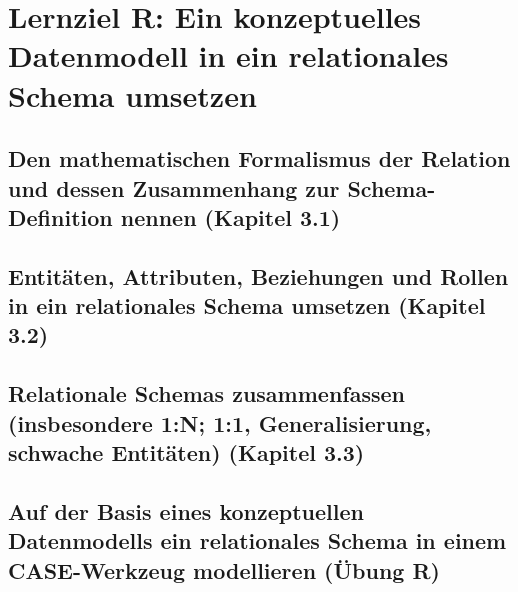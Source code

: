 \section{Lernziel R: Ein konzeptuelles Datenmodell in ein relationales Schema umsetzen}

\subsection{Den mathematischen Formalismus der Relation und dessen Zusammenhang zur Schema-Definition nennen (Kapitel 3.1)}

\subsection{Entitäten, Attributen, Beziehungen und Rollen in ein relationales Schema umsetzen (Kapitel 3.2)}

\subsection{Relationale Schemas zusammenfassen (insbesondere 1:N; 1:1, Generalisierung, schwache Entitäten) (Kapitel 3.3)}

\subsection{Auf der Basis eines konzeptuellen Datenmodells ein relationales Schema in einem CASE-Werkzeug modellieren (Übung R)}